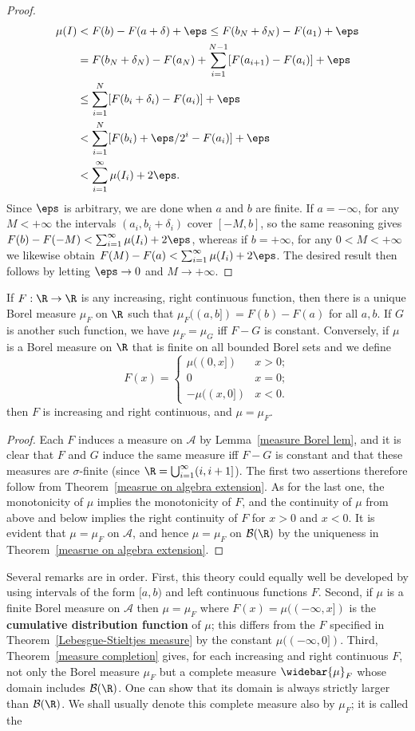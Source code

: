 \begin{proof}
\begin{align*}
\mu(I)&<F(b)-F(a+\delta)+\eps\leq F(b_N+\delta_N)-F(a_1)+\eps\\
&=F(b_N+\delta_N)-F(a_N)+\sum_{i=1}^{N-1}[F(a_{i+1})-F(a_i)]+\eps\\
&\leq\sum_{i=1}^{N}[F(b_i+\delta_i)-F(a_i)]+\eps\\
&<\sum_{i=1}^{N}[F(b_i)+\eps/2^i-F(a_i)]+\eps\\
&<\sum_{i=1}^{\infty}\mu(I_i)+2\eps.
\end{align*}
Since $\eps$ is arbitrary, we are done when $a$ and $b$ are finite. If $a=-\infty$, for any $M<+\infty$ the intervals $(a_i,b_i+\delta_i)$ cover $[-M,b]$, so the same reasoning gives $F(b)-F(-M)<\sum_{i=1}^{\infty}\mu(I_i)+2\eps$, whereas if $b=+\infty$, for any $0<M<+\infty$ we likewise obtain $F(M)-F(a)<\sum_{i=1}^{\infty}\mu(I_i)+2\eps$. The desired result then follows
by letting $\eps\to 0$ and $M\to+\infty$.
\end{proof}
\begin{theorem}\label{Lebesgue-Stieltjes measure}
If $F:\R\to\R$ is any increasing, right continuous function, then there is a unique Borel measure $\mu_F$ on $\R$ such that $\mu_F((a,b])=F(b)-F(a)$ for all $a,b$. If $G$ is another such function, we have $\mu_F=\mu_G$ iff $F-G$ is constant. Conversely, if $\mu$ is a Borel measure on $\R$ that is finite on all bounded Borel sets and we define
\[F(x)=\begin{cases}
\mu((0,x])&x>0;\\
0&x=0;\\
-\mu((x,0])&x<0.
\end{cases}\]
then $F$ is increasing and right continuous, and $\mu=\mu_F$.
\end{theorem}
\begin{proof}
Each $F$ induces a measure on $\mathcal{A}$ by Lemma~\ref{measure Borel lem}, and it is clear that $F$ and $G$ induce the same measure iff $F-G$ is constant and that these measures are $\sigma$-finite (since $\R=\bigcup_{i=1}^{\infty}(i,i+1]$). The first two assertions therefore follow from
Theorem~\ref{measrue on algebra extension}. As for the last one, the monotonicity of $\mu$ implies the monotonicity of $F$, and the continuity of $\mu$ from above and below implies the right continuity of $F$ for $x>0$ and $x<0$. It is evident that $\mu=\mu_F$ on $\mathcal{A}$, and hence $\mu=\mu_F$ on $\mathcal{B}(\R)$ by the uniqueness in Theorem~\ref{measrue on algebra extension}.
\end{proof}
Several remarks are in order. First, this theory could equally well be developed by using intervals of the form $[a,b)$ and left continuous functions $F$. Second, if $\mu$ is a finite Borel measure on $\mathcal{A}$ then $\mu=\mu_F$ where $F(x)=\mu((-\infty,x])$ is the \textbf{cumulative distribution function} of $\mu$; this differs from the $F$ specified in Theorem~\ref{Lebesgue-Stieltjes measure} by the constant $\mu((-\infty,0])$. Third, Theorem~\ref{measure completion} gives, for each increasing and right continuous $F$, not only the Borel measure $\mu_F$ but a complete measure $\widebar{\mu}_F$ whose domain includes $\mathcal{B}(\R)$. One can show that its domain is always strictly larger than $\mathcal{B}(\R)$. We shall usually denote this complete measure also by $\mu_F$; it is called the
